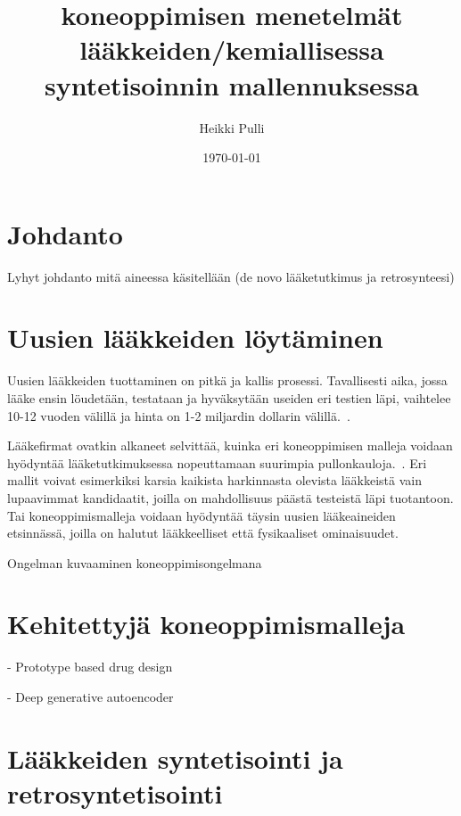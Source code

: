 \documentclass[finnish,twoside,censored,subject,sw-line]{HYthesisML}
\title{koneoppimisen menetelmät lääkkeiden/kemiallisessa syntetisoinnin mallennuksessa}
\author{Heikki Pulli}
\date{\today}
\begin{document}
\maketitle

\newpage
\mytableofcontents
\mainmatter

\chapter{Johdanto}

Lyhyt johdanto mitä aineessa käsitellään (de novo lääketutkimus ja retrosynteesi)

\chapter{Uusien lääkkeiden löytäminen}


Uusien lääkkeiden tuottaminen on pitkä ja kallis prosessi. Tavallisesti aika, jossa
lääke ensin löudetään, testataan ja hyväksytään useiden eri testien läpi, vaihtelee
10-12 vuoden välillä ja hinta on 1-2 miljardin dollarin välillä.~\cite{EkinsSean2019Emlf}.

Lääkefirmat ovatkin alkaneet selvittää, kuinka eri koneoppimisen malleja voidaan
hyödyntää lääketutkimuksessa nopeuttamaan suurimpia pullonkauloja.~\cite{EkinsSean2019Emlf}.
Eri mallit voivat esimerkiksi karsia kaikista harkinnasta olevista lääkkeistä vain
lupaavimmat kandidaatit, joilla on mahdollisuus päästä testeistä läpi tuotantoon.
Tai koneoppimismalleja voidaan hyödyntää täysin uusien lääkeaineiden etsinnässä, joilla
on halutut lääkkeelliset että fysikaaliset ominaisuudet.~\cite{!lähde!}

Ongelman kuvaaminen koneoppimisongelmana~\cite{10.1145/3219819.3219882,KadurinArtur2017dAAG}

\chapter{Kehitettyjä koneoppimismalleja}
- Prototype based drug design~\cite{10.1145/3219819.3219882}

- Deep generative autoencoder~\cite{KadurinArtur2017dAAG}

\chapter{Lääkkeiden syntetisointi ja retrosyntetisointi}
\end{document}
